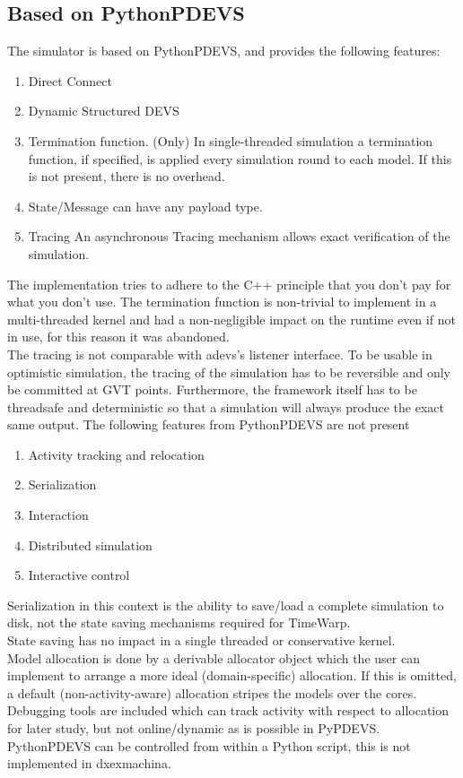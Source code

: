 \subsection{Based on PythonPDEVS}
The simulator is based on PythonPDEVS, and provides the following features: 
\begin{enumerate}
	\item Direct Connect
	\item Dynamic Structured DEVS
	\item Termination function. (Only) In single-threaded simulation a termination function, if specified, is applied every simulation round to each model. If this is not present, there is no overhead.
	\item State/Message can have any payload type.
	\item Tracing An asynchronous Tracing mechanism allows exact verification of the simulation.
\end{enumerate}
The implementation tries to adhere to the C++ principle that you don't pay for what you don't use. The termination function is non-trivial to implement in a multi-threaded kernel and had a non-negligible impact on the runtime even if not in use, for this reason it was abandoned.\\
The tracing is not comparable with adevs's listener interface. To be usable in optimistic simulation, the tracing of the simulation has to be reversible and only be committed at GVT points. Furthermore, the framework itself has to be threadsafe and deterministic so that a simulation will always produce the exact same output.
The following features from PythonPDEVS are not present
\begin{enumerate}
	\item Activity tracking and relocation
	\item Serialization
	\item Interaction 
	\item Distributed simulation
	\item Interactive control
\end{enumerate}
Serialization in this context is the ability to save/load a complete simulation to disk, not the state saving mechanisms required for TimeWarp.\\ State saving has no impact in a single threaded or conservative kernel.\\
Model allocation is done by a derivable allocator object which the user can  implement to arrange a more ideal (domain-specific) allocation. If this is omitted, a default (non-activity-aware) allocation stripes the models over the cores.\\
Debugging tools are included which can track activity with respect to allocation for later study, but not online/dynamic as is possible in PyPDEVS.\\
PythonPDEVS can be controlled from within a Python script, this is not implemented in dxexmachina. 

